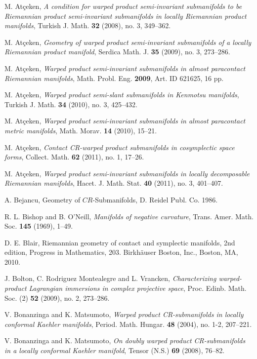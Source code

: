 \documentclass{amsart}
\theoremstyle{plain}
\numberwithin{equation}{section}
\theoremstyle{remark}
\numberwithin{equation}{section}
\begin{document}
\begin{thebibliography}{120}
 M. At\c{c}eken, {\it A condition for warped product semi-invariant submanifolds to be Riemannian product semi-invariant submanifolds in locally Riemannian product manifolds}, Turkish J. Math. {\bf 32} (2008), no. 3, 349--362.

 M. At\c{c}eken, {\it Geometry of warped product semi-invariant submanifolds of a locally Riemannian product manifold}, Serdica Math. J. {\bf 35} (2009), no. 3, 273--286.

 M. At\c{c}eken, {\it  Warped product semi-invariant submanifolds in almost paracontact Riemannian manifolds},  Math. Probl. Eng. {\bf 2009}, Art. ID 621625, 16 pp.

 M. At\c{c}eken, {\it  Warped product semi-slant submanifolds in Kenmotsu manifolds}, Turkish J. Math. {\bf 34} (2010), no. 3, 425--432.

 M. At\c{c}eken, {\it  Warped product semi-invariant submanifolds in almost paracontact metric manifolds}, Math. Morav. {\bf 14} (2010),  15--21.

 M. At\c{c}eken, {\it Contact CR-warped product submanifolds in cosymplectic space forms},  Collect. Math. {\bf 62} (2011), no. 1, 17--26.

  M. At\c{c}eken, {\it  Warped product semi-invariant submanifolds in locally decomposable Riemannian manifolds},  Hacet. J. Math. Stat. {\bf 40} (2011), no. 3, 401--407.

 A. Bejancu,  Geometry of $CR$-Submanifolds,  D. Reidel Publ. Co. 1986.

 R. L. Bishop and B. O'Neill, {\em Manifolds of negative curvature}, Trans. Amer. Math. Soc. {\bf 145} (1969), 1--49.

 D. E. Blair,  Riemannian geometry of contact and symplectic manifolds, 2nd edition, Progress in Mathematics, 203. Birkh\"auser Boston, Inc., Boston, MA, 2010. 

  J. Bolton,  C. Rodriguez Montealegre and L. Vrancken, {\it Characterizing warped-product Lagrangian immersions in complex projective space}, Proc. Edinb. Math. Soc. (2) {\bf 52} (2009), no. 2, 273--286.

 V. Bonanzinga and K. Matsumoto, {\it  Warped product CR-submanifolds in locally conformal Kaehler manifolds}, Period. Math. Hungar. {\bf 48} (2004), no. 1-2, 207--221. 

 V. Bonanzinga and K. Matsumoto, {\it On doubly warped product CR-submanifolds in a locally  conformal Kaehler manifold}, Tensor (N.S.) {\bf 69} (2008), 76--82.


\end{thebibliography}
\end{document}
